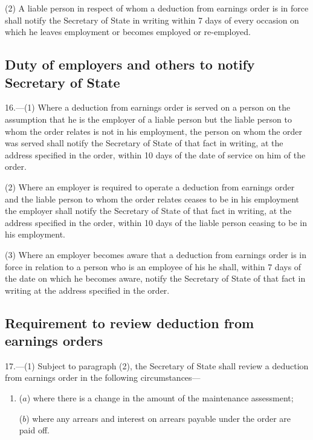 \documentclass[a4paper]{article}
\begin{document}
(2) A liable person in respect of whom a deduction from earnings order is in force shall notify the Secretary of State in writing within 7 days of every occasion on which he leaves employment or becomes employed or re-employed.

\subsection[16. Duty of employers and others to notify Secretary of State]{Duty of employers and others to notify Secretary of State}

16.—(1) Where a deduction from earnings order is served on a person on the assumption that he is the employer of a liable person but the liable person to whom the order relates is not in his employment, the person on whom the order was served shall notify the Secretary of State of that fact in writing, at the address specified in the order, within 10 days of the date of service on him of the order.

(2) Where an employer is required to operate a deduction from earnings order and the liable person to whom the order relates ceases to be in his employment the employer shall notify the Secretary of State of that fact in writing, at the address specified in the order, within 10 days of the liable person ceasing to be in his employment.

(3) Where an employer becomes aware that a deduction from earnings order is in force in relation to a person who is an employee of his he shall, within 7 days of the date on which he becomes aware, notify the Secretary of State of that fact in writing at the address specified in the order.

\subsection[17. Requirement to review deduction from earnings orders]{Requirement to review deduction from earnings orders}

%

17.—(1) Subject to paragraph (2), the Secretary of State shall review a deduction from earnings order in the following circumstances—
\begin{enumerate}\item[]
($a$) where there is a change in the amount of the maintenance assessment;

($b$) where any arrears and interest on arrears payable under the order are paid off.
\end{enumerate}
\end{document}
